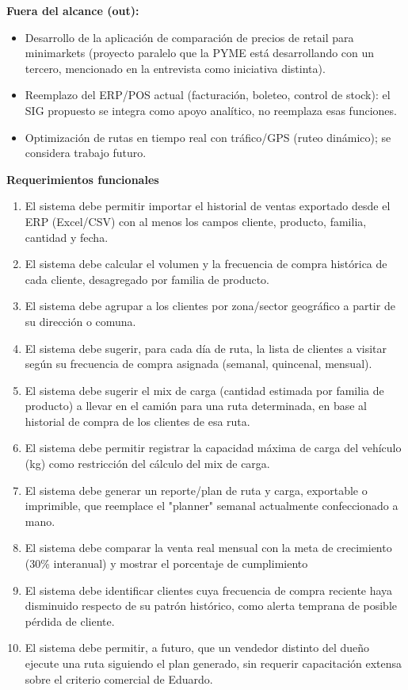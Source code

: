 \documentclass[10pt,a4paper]{article}
\begin{document}
\textbf{Fuera del alcance (out):}
\begin{itemize}[leftmargin=1.2cm]
    \item Desarrollo de la aplicación de comparación de precios de retail para minimarkets (proyecto paralelo que la PYME está desarrollando con un tercero, mencionado en la entrevista como iniciativa distinta).
    \item Reemplazo del ERP/POS actual (facturación, boleteo, control de stock): el SIG propuesto se integra como apoyo analítico, no reemplaza esas funciones.
    \item Optimización de rutas en tiempo real con tráfico/GPS (ruteo dinámico); se considera trabajo futuro.
\end{itemize}

\textbf{Requerimientos funcionales}

\begin{enumerate}[leftmargin=1.5cm, itemsep=0.4em]
    \item El sistema debe permitir importar el historial de ventas exportado desde el ERP (Excel/CSV) con al menos los campos cliente, producto, familia, cantidad y fecha. 
    \item El sistema debe calcular el volumen y la frecuencia de compra histórica de cada cliente, desagregado por familia de producto. 
    \item El sistema debe agrupar a los clientes por zona/sector geográfico a partir de su dirección o comuna.
    \item El sistema debe sugerir, para cada día de ruta, la lista de clientes a visitar según su frecuencia de compra asignada (semanal, quincenal, mensual). 
    \item El sistema debe sugerir el mix de carga (cantidad estimada por familia de producto) a llevar en el camión para una ruta determinada, en base al historial de compra de los clientes de esa ruta.
    \item El sistema debe permitir registrar la capacidad máxima de carga del vehículo (kg) como restricción del cálculo del mix de carga. 
    \item El sistema debe generar un reporte/plan de ruta y carga, exportable o imprimible, que reemplace el "planner" semanal actualmente confeccionado a mano.
    \item El sistema debe comparar la venta real mensual con la meta de crecimiento (30\% interanual) y mostrar el porcentaje de cumplimiento
    \item El sistema debe identificar clientes cuya frecuencia de compra reciente haya disminuido respecto de su patrón histórico, como alerta temprana de posible pérdida de cliente. 
    \item El sistema debe permitir, a futuro, que un vendedor distinto del dueño ejecute una ruta siguiendo el plan generado, sin requerir capacitación extensa sobre el criterio comercial de Eduardo. 
    
\end{enumerate}
\end{document}
